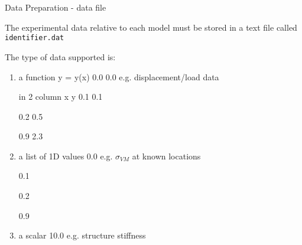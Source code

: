 \begin{frame}[fragile]{Data Preparation - data file}

The experimental data relative to each model must be stored in a text file called \texttt{{\color{red} identifier}.dat}

\vfill

The type of data supported is:
\begin{enumerate}
\item a function  y = y(x)
\hspace{.5cm} 0.0 0.0 \hspace{.2cm} e.g. displacement/load data

in 2 column x y
\hspace{1.15cm} 0.1 0.1

\hspace{3.8cm} 0.2 0.5

\hspace{3.8cm} 0.9 2.3

\item a list of 1D values
\hspace{.75cm} 0.0  \hspace{.2cm} e.g. $\sigma_{VM}$ at known locations

\hspace{3.8cm} 0.1

\hspace{3.8cm} 0.2

\hspace{3.8cm} 0.9
\item a scalar
\hspace{2.3cm} 10.0  \hspace{.2cm} e.g. structure stiffness
\end{enumerate}
\end{frame}